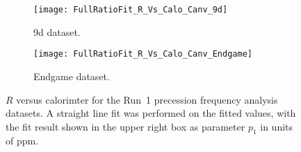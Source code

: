 \begin{landscape}
\begin{figure}[]
\begin{minipage}[t]{0.48\linewidth}
    \begin{subfigure}[]{0.5\linewidth}
        \centering
        \texttt{[image: FullRatioFit\_R\_Vs\_Calo\_Canv\_9d]}
        \caption{9d dataset.}
    \end{subfigure}%
    \begin{subfigure}[]{0.5\linewidth}
        \centering
        \texttt{[image: FullRatioFit\_R\_Vs\_Calo\_Canv\_Endgame]}
        \caption{Endgame dataset.}
    \end{subfigure}
\captionsetup{width=0.9\linewidth}
\caption[$R$ versus calorimeter number]{$R$ versus calorimter for the Run~1 precession frequency analysis datasets. A straight line fit was performed on the fitted values, with the fit result shown in the upper right box as parameter $p_{1}$ in units of ppm.}
\label{fig:caloFits_R}
\end{minipage}
\end{figure}
\end{landscape}










